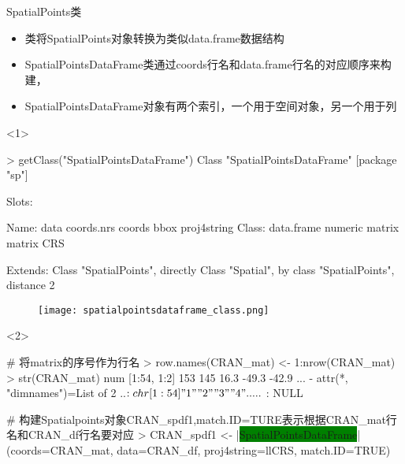 \begin{frame}[t,fragile]{\subsecname}{SpatialPoints类}
\begin{itemize}
\item<1-> 类将SpatialPoints对象转换为类似data.frame数据结构
\item<2-> SpatialPointsDataFrame类通过coords行名和data.frame行名的对应顺序来构建，
\item<4-> SpatialPointsDataFrame对象有两个索引，一个用于空间对象，另一个用于列
\end{itemize}

\begin{overlayarea}{\textwidth}{\textheight}
\begin{onlyenv}<1>
\begin{rcode}
> getClass("SpatialPointsDataFrame")
Class "SpatialPointsDataFrame" [package "sp"]

Slots:                                                                  

Name:         data  coords.nrs      coords        bbox proj4string
Class:  data.frame     numeric      matrix      matrix         CRS

Extends: 
Class "SpatialPoints", directly
Class "Spatial", by class "SpatialPoints", distance 2
\end{rcode}
\begin{figure}[ht]\vspace{-10pt}
  \texttt{[image: spatialpointsdataframe\_class.png]}
\end{figure}
\end{onlyenv}

\begin{onlyenv}<2>
\begin{rcode}
# 将matrix的序号作为行名
> row.names(CRAN_mat) <- 1:nrow(CRAN_mat)
> str(CRAN_mat)
 num [1:54, 1:2] 153 145 16.3 -49.3 -42.9 ...
 - attr(*, "dimnames")=List of 2
  ..$ : chr [1:54] "1" "2" "3" "4" ...
  ..$ : NULL

# 构建Spatialpoints对象CRAN\_spdf1,match.ID=TURE表示根据CRAN\_mat行名和CRAN\_df行名要对应
> CRAN_spdf1 <- |\colorbox{green}{SpatialPointsDataFrame}|(coords=CRAN_mat, data=CRAN_df, proj4string=llCRS, match.ID=TRUE)
\end{rcode}
\end{onlyenv}


\end{overlayarea}
\end{frame}
